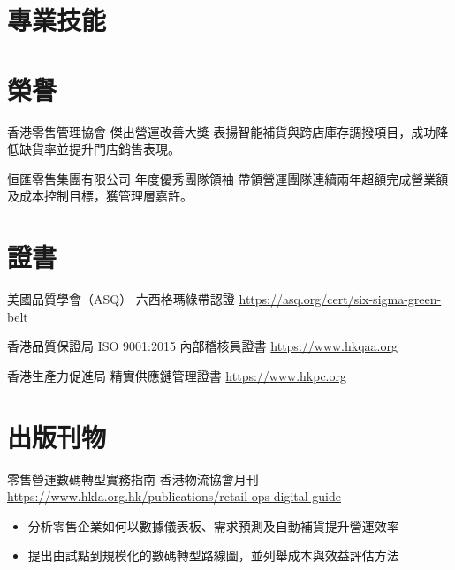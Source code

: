 \documentclass[a4paper, serif, 10pt]{moderncv}
\begin{document}
\section{專業技能}

\section{榮譽}

        {香港零售管理協會}
        {傑出營運改善大獎}
        {}
        {}
        {表揚智能補貨與跨店庫存調撥項目，成功降低缺貨率並提升門店銷售表現。}

        {恒匯零售集團有限公司}
        {年度優秀團隊領袖}
        {}
        {}
        {帶領營運團隊連續兩年超額完成營業額及成本控制目標，獲管理層嘉許。}
\section{證書}

        {美國品質學會（ASQ）}
        {六西格瑪綠帶認證}
        {\url{https://asq.org/cert/six-sigma-green-belt}}
        {}
        {}

        {香港品質保證局}
        {ISO 9001:2015 內部稽核員證書}
        {\url{https://www.hkqaa.org}}
        {}
        {}

        {香港生產力促進局}
        {精實供應鏈管理證書}
        {\url{https://www.hkpc.org}}
        {}
        {}
\section{出版刊物}

        {零售營運數碼轉型實務指南}
        {香港物流協會月刊}
        {\url{https://www.hkla.org.hk/publications/retail-ops-digital-guide}}
        {}
        {\begin{itemize}
\item 分析零售企業如何以數據儀表板、需求預測及自動補貨提升營運效率
\item 提出由試點到規模化的數碼轉型路線圖，並列舉成本與效益評估方法
\end{itemize}}
\end{document}
